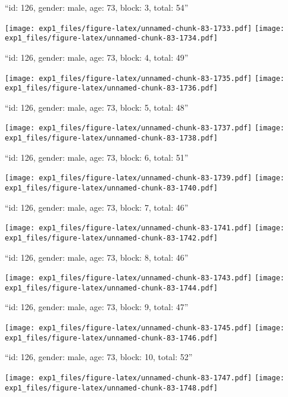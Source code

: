 \documentclass[11pt,,]{article}
\begin{document}
\newpage
[1] 

``id: 126, gender: male, age: 73, block: 3, total: 54''

\texttt{[image: exp1\_files/figure-latex/unnamed-chunk-83-1733.pdf]}
\texttt{[image: exp1\_files/figure-latex/unnamed-chunk-83-1734.pdf]}

\newpage
[1] 

``id: 126, gender: male, age: 73, block: 4, total: 49''

\texttt{[image: exp1\_files/figure-latex/unnamed-chunk-83-1735.pdf]}
\texttt{[image: exp1\_files/figure-latex/unnamed-chunk-83-1736.pdf]}

\newpage
[1] 

``id: 126, gender: male, age: 73, block: 5, total: 48''

\texttt{[image: exp1\_files/figure-latex/unnamed-chunk-83-1737.pdf]}
\texttt{[image: exp1\_files/figure-latex/unnamed-chunk-83-1738.pdf]}

\newpage
[1] 

``id: 126, gender: male, age: 73, block: 6, total: 51''

\texttt{[image: exp1\_files/figure-latex/unnamed-chunk-83-1739.pdf]}
\texttt{[image: exp1\_files/figure-latex/unnamed-chunk-83-1740.pdf]}

\newpage
[1] 

``id: 126, gender: male, age: 73, block: 7, total: 46''

\texttt{[image: exp1\_files/figure-latex/unnamed-chunk-83-1741.pdf]}
\texttt{[image: exp1\_files/figure-latex/unnamed-chunk-83-1742.pdf]}

\newpage
[1] 

``id: 126, gender: male, age: 73, block: 8, total: 46''

\texttt{[image: exp1\_files/figure-latex/unnamed-chunk-83-1743.pdf]}
\texttt{[image: exp1\_files/figure-latex/unnamed-chunk-83-1744.pdf]}

\newpage
[1] 

``id: 126, gender: male, age: 73, block: 9, total: 47''

\texttt{[image: exp1\_files/figure-latex/unnamed-chunk-83-1745.pdf]}
\texttt{[image: exp1\_files/figure-latex/unnamed-chunk-83-1746.pdf]}

\newpage
[1] 

``id: 126, gender: male, age: 73, block: 10, total: 52''

\texttt{[image: exp1\_files/figure-latex/unnamed-chunk-83-1747.pdf]}
\texttt{[image: exp1\_files/figure-latex/unnamed-chunk-83-1748.pdf]}
\end{document}
